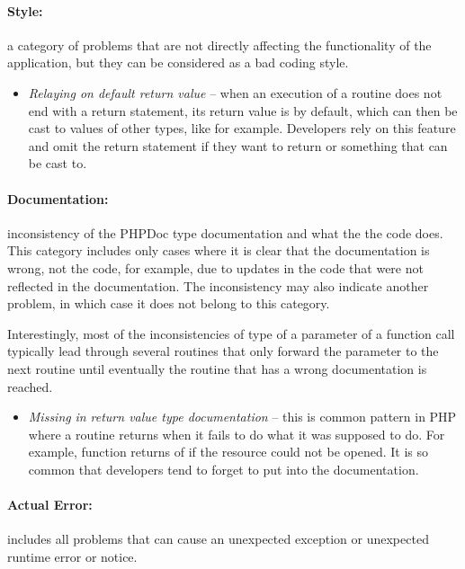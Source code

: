 \paragraph*{Style:} a category of problems that 
are not directly affecting the functionality of the 
application, but they can be considered as a bad 
coding style. 

\begin{itemize}
    \item[] \textit{Relaying on default return value} -- when an execution of a 
        routine does not end with a return statement, its 
        return value is  by default, which can then 
        be cast to values of other types, like  
        for example. Developers rely on this feature and omit 
        the return statement if they want to return  or 
        something that  can be cast to.
\end{itemize}

\paragraph*{Documentation:} inconsistency of the PHPDoc type 
documentation and what the the code does. This category includes 
only cases where it is clear that the documentation is wrong, not the code, 
for example, due to updates in the code that were not reflected 
in the documentation. The inconsistency may also indicate 
another problem, in which case it does not belong to this category. 

Interestingly, most of the inconsistencies of type of a parameter 
of a function call typically lead through several routines that 
only forward the parameter to the next routine until 
eventually the routine that has a wrong documentation is reached.

\begin{itemize}
    \item[] \textit{Missing}  \textit{in return value type documentation} -- 
        this is common pattern in PHP where a routine returns  
        when it fails to do what it was supposed to do. For example, 
        function  returns  of  
        if the resource could not be opened. It is so common that 
        developers tend to forget to put  into the documentation.
\end{itemize}

\paragraph*{Actual Error:} includes all problems that can cause 
an unexpected exception or unexpected runtime error or notice.


